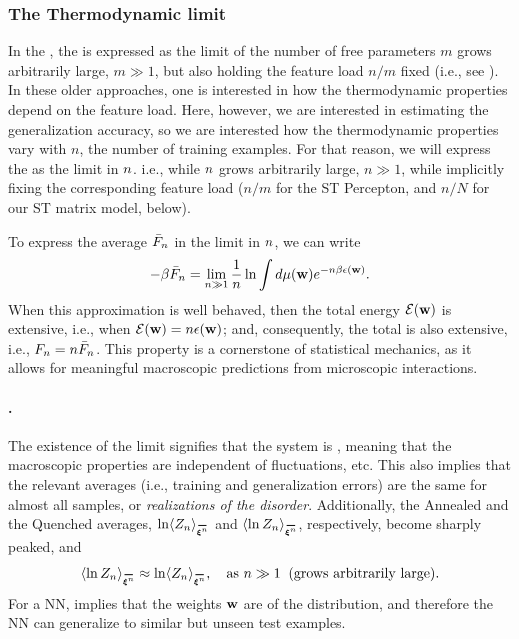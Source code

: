 \subsubsection{The Thermodynamic limit}
\label{sxn:largeN_and_SPA}
In the \SMOG, the \ThermodynamicLimit is expressed as the limit of the number of free parameters $m$ grows arbitrarily large, $m \gg 1$, but also holding the feature load $n/m$ fixed (i.e., see \cite{SST92}).  In these older approaches, one is interested in how the thermodynamic properties depend on the feature load. Here, however, we are interested in estimating the generalization accuracy, so we are interested how the thermodynamic properties vary with $n$, the number of training examples.  For that reason, we will express the \ThermodynamicLimit as the \LargeN limit in $n$. i.e., while $n$ grows arbitrarily large,  $n \gg 1$, while implicitly fixing the corresponding feature load ($n/m$ for the ST Percepton,  and $n/N$ for our ST matrix model, below).

To express the average \FreeEnergy $\bar{F}_{n}$ in the \LargeN limit in $n$, we can write
\begin{align}
  -\beta\bar{F}_{n} = \lim_{n\gg 1}\frac{1}{n}\ln \int d\mu({\mathbf{w}}) e^{-n\beta\epsilon({\mathbf{w}})}  .
\end{align}
When this \LargeN approximation is well behaved,
then the total energy $\mathcal{E}(\mathbf{w})$ is extensive, i.e., when $\mathcal{E}(\mathbf{w})=n\epsilon({\mathbf{w}})$;
and, consequently, the total \FreeEnergy is also extensive, i.e., $F_{n}=n\bar{F}_{n}$.
This property is a cornerstone of statistical mechanics, as it allows for meaningful macroscopic predictions from microscopic interactions.

\paragraph{\SelfAveraging.}
The existence of the limit signifies that the system is \emph{\SelfAveraging}, meaning that the macroscopic properties are independent of fluctuations, etc.
This also implies that the relevant averages
(i.e., training and generalization errors) are the same for almost all samples, or \emph{realizations of the disorder}.
Additionally, the Annealed and the Quenched averages,
$\ln \langle Z_{\ND} \rangle_{\AVGNDXIn}$ and $\langle \ln Z_{\ND} \rangle_{\AVGNDXIn}$, respectively,
become sharply peaked, and
\begin{align}
\langle \ln Z_{\ND} \rangle_{\AVGNDXIn} \approx \ln \langle Z_{\ND} \rangle_{\AVGNDXIn}, \quad \text{as } \ND \gg 1\;\; \text{(grows arbitrarily large)}.
\end{align}
For a NN, \SelfAveraging implies that the weights ${\mathbf{w}}$ are \emph{\Typical} of the distribution,
and therefore the NN can generalize to similar but unseen test examples.

